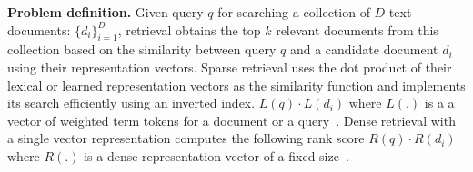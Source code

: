 {\bf Problem definition.}
Given query $q$ for searching a collection of $D$ text documents:   $ \{d_i\}^D_{i=1}$, 
retrieval  obtains the top $k$ relevant documents from this collection based on
the similarity between query $q$ and a candidate document  $d_i$ using  their
representation vectors.
Sparse retrieval uses  the dot product of their lexical or learned representation vectors as the similarity function
and implements its search efficiently using an inverted index. 
$L(q) \cdot  L(d_i)$
where $L(.)$ is a a vector of weighted term tokens for a document or a 
query~\cite{Robertson2009BM25, Dai2020deepct, Mallia2021deepimpact, Lin2021unicoil,2021NAACL-Gao-COIL}. 
Dense retrieval with a single vector representation computes the following rank score
$R(q) \cdot  R(d_i)$
where $R(.)$ is a dense representation vector  of a fixed size~\cite{Karpukhin2020DPR}.


